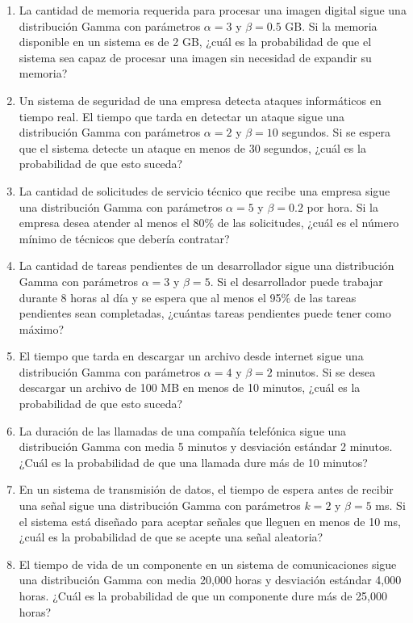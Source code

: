 \begin{Ejer}
\begin{enumerate}
\item La cantidad de memoria requerida para procesar una imagen digital sigue una distribución Gamma con parámetros $\alpha = 3$ y $\beta = 0.5$ GB. Si la memoria disponible en un sistema es de 2 GB, ¿cuál es la probabilidad de que el sistema sea capaz de procesar una imagen sin necesidad de expandir su memoria?

\item Un sistema de seguridad de una empresa detecta ataques informáticos en tiempo real. El tiempo que tarda en detectar un ataque sigue una distribución Gamma con parámetros $\alpha = 2$ y $\beta = 10$ segundos. Si se espera que el sistema detecte un ataque en menos de 30 segundos, ¿cuál es la probabilidad de que esto suceda?

\item La cantidad de solicitudes de servicio técnico que recibe una empresa sigue una distribución Gamma con parámetros $\alpha = 5$ y $\beta = 0.2$ por hora. Si la empresa desea atender al menos el 80\% de las solicitudes, ¿cuál es el número mínimo de técnicos que debería contratar?

\item La cantidad de tareas pendientes de un desarrollador sigue una distribución Gamma con parámetros $\alpha = 3$ y $\beta = 5$. Si el desarrollador puede trabajar durante 8 horas al día y se espera que al menos el 95\% de las tareas pendientes sean completadas, ¿cuántas tareas pendientes puede tener como máximo?

\item El tiempo que tarda en descargar un archivo desde internet sigue una distribución Gamma con parámetros $\alpha = 4$ y $\beta = 2$ minutos. Si se desea descargar un archivo de 100 MB en menos de 10 minutos, ¿cuál es la probabilidad de que esto suceda?

\item La duración de las llamadas de una compañía telefónica sigue una distribución Gamma con media 5 minutos y desviación estándar 2 minutos. ¿Cuál es la probabilidad de que una llamada dure más de 10 minutos?

\item En un sistema de transmisión de datos, el tiempo de espera antes de recibir una señal sigue una distribución Gamma con parámetros $k = 2$ y $\beta = 5$ ms. Si el sistema está diseñado para aceptar señales que lleguen en menos de 10 ms, ¿cuál es la probabilidad de que se acepte una señal aleatoria?

\item El tiempo de vida de un componente en un sistema de comunicaciones sigue una distribución Gamma con media 20,000 horas y desviación estándar 4,000 horas. ¿Cuál es la probabilidad de que un componente dure más de 25,000 horas?

\end{enumerate}
\end{Ejer} 


